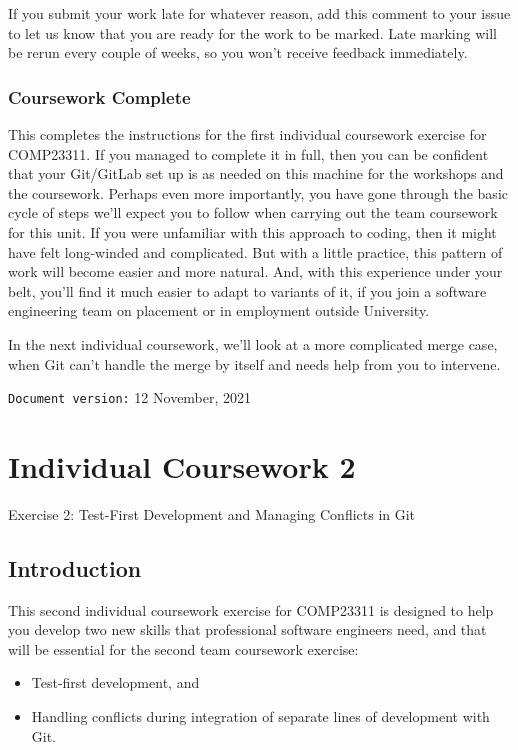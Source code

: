 \documentclass[
]{book}
\providecommand{\tightlist}{%
  \setlength{\itemsep}{0pt}\setlength{\parskip}{0pt}}
\begin{document}
If you submit your work late for whatever reason, add this comment to your issue to let us know that you are ready for the work to be marked. Late marking will be rerun every couple of weeks, so you won't receive feedback immediately.

\hypertarget{gameover}{%
\subsection{Coursework Complete}\label{gameover}}

This completes the instructions for the first individual coursework exercise for COMP23311. If you managed to complete it in full, then you can be confident that your Git/GitLab set up is as needed on this machine for the workshops and the coursework. Perhaps even more importantly, you have gone through the basic cycle of steps we'll expect you to follow when carrying out the team coursework for this unit. If you were unfamiliar with this approach to coding, then it might have felt long-winded and complicated. But with a little practice, this pattern of work will become easier and more natural. And, with this experience under your belt, you'll find it much easier to adapt to variants of it, if you join a software engineering team on placement or in employment outside University.

In the next individual coursework, we'll look at a more complicated merge case, when Git can't handle the merge by itself and needs help from you to intervene.

\texttt{Document\ version:} 12 November, 2021

\hypertarget{conflicting}{%
\chapter{Individual Coursework 2}\label{conflicting}}

Exercise 2: Test-First Development and Managing Conflicts in Git

\hypertarget{introt}{%
\section{Introduction}\label{introt}}

This second individual coursework exercise for COMP23311 is designed to help you develop two new skills that professional software engineers need, and that will be essential for the second team coursework exercise:

\begin{itemize}
\tightlist
\item
  Test-first development, and
\item
  Handling conflicts during integration of separate lines of development with Git.
\end{itemize}
\end{document}
